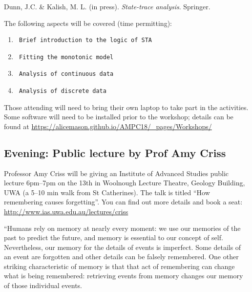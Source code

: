 \documentclass[]{article}
\begin{document}
Dunn, J.C. \& Kalish, M. L. (in press). \emph{State-trace analysis}.
Springer.

The following aspects will be covered (time permitting):

\begin{enumerate}
\def\labelenumi{\arabic{enumi}.}
\item
\begin{verbatim}
 Brief introduction to the logic of STA
\end{verbatim}
\item
\begin{verbatim}
 Fitting the monotonic model
\end{verbatim}
\item
\begin{verbatim}
 Analysis of continuous data
\end{verbatim}
\item
\begin{verbatim}
 Analysis of discrete data
\end{verbatim}
\end{enumerate}

Those attending will need to bring their own laptop to take part in the
activities. Some software will need to be installed prior to the
workshop; details can be found at
\url{https://alicemason.github.io/AMPC18/_pages/Workshops/}

\subsection{Evening: Public lecture by Prof Amy
Criss}\label{evening-public-lecture-by-prof-amy-criss}

Professor Amy Criss will be giving an Institute of Advanced Studies
public lecture 6pm--7pm on the 13th in Woolnough Lecture Theatre,
Geology Building, UWA (a 5--10 min walk from St Catherines). The talk is
titled ``How remembering causes forgetting''. You can find out more
details and book a seat: \url{http://www.ias.uwa.edu.au/lectures/criss}

``Humans rely on memory at nearly every moment: we use our memories of
the past to predict the future, and memory is essential to our concept
of self. Nevertheless, our memory for the details of events is
imperfect. Some details of an event are forgotten and other details can
be falsely remembered. One other striking characteristic of memory is
that that act of remembering can change what is being remembered:
retrieving events from memory changes our memory of those individual
events.
\end{document}

